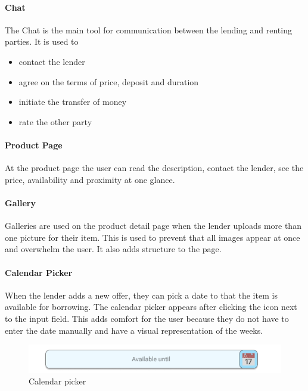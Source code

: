 	\paragraph{Chat}
		The Chat is the main tool for communication between the lending and renting parties. It is used to 
		\begin{itemize}
			\item contact the lender
			\item agree on the terms of price, deposit and duration
			\item initiate the transfer of money
			\item rate the other party
		\end{itemize}
	\par
	
	\paragraph{Product Page}
		At the product page the user can read the description, contact the lender, see the price, availability and proximity at one glance.
	\par
	
	\paragraph{Gallery}
		Galleries are used on the product detail page when the lender uploads more than one picture for their item. This is used to prevent that all images appear at once and overwhelm the user. It also adds structure to the page.
	\par
	
	\paragraph{Calendar Picker}
		When the lender adds a new offer, they can pick a date to that the item is available for borrowing. The calendar picker appears after clicking the icon next to the input field. This adds comfort for the user because they do not have to enter the date manually and have a visual representation of the weeks.
		
		\begin{figure}[H]
			\centering
			\includegraphics[width=0.5\linewidth]{abb/3_design_guidelines/calendar_picker.png}
			\caption{Calendar picker}
			\label{fig:calendar_picker}
			\centering
		\end{figure}
	\par
	
